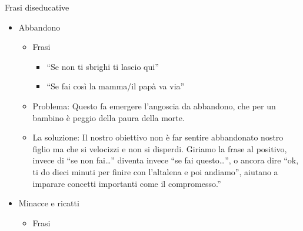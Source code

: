 \documentclass[12pt]{book} %
\begin{document}
Frasi diseducative

\begin{itemize}
\item Abbandono

\begin{itemize}
\item Frasi

\begin{itemize}
\item “Se non ti sbrighi ti lascio qui”
\item “Se fai così la mamma/il papà va via”
\end{itemize}
\item Problema: Questo fa emergere l'angoscia da abbandono, che per un bambino è peggio della paura della morte.
\item La soluzione: Il nostro obiettivo non è far sentire abbandonato nostro figlio ma che si velocizzi e non si
disperdi. Giriamo la frase al positivo, invece di “se non fai…” diventa invece “se fai questo…”, o ancora dire “ok, ti
do dieci minuti per finire con l'altalena e poi andiamo”, aiutano a imparare concetti importanti
come il compromesso.”
\end{itemize}
\item Minacce e ricatti

\begin{itemize}
\item Frasi


\end{itemize}
\end{itemize}
\end{document}
